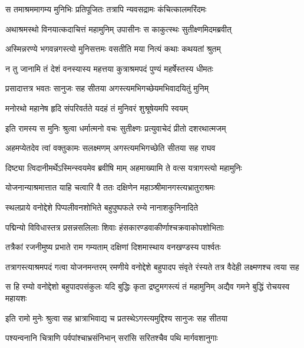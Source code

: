\twolineshloka
{स तमाश्रममागम्य मुनिभिः प्रतिपूजितः}
{तत्रापि न्यवसद्रामः कंचित्कालमरिंदमः} %

\twolineshloka
{अथाश्रमस्थो विनयात्कदाचित्तं महामुनिम्}
{उपासीनः स काकुत्स्थः सुतीक्ष्णमिदमब्रवीत्} %

\twolineshloka
{अस्मिन्नरण्ये भगवन्नगस्त्यो मुनिसत्तमः}
{वसतीति मया नित्यं कथाः कथयतां श्रुतम्} %

\twolineshloka
{न तु जानामि तं देशं वनस्यास्य महत्तया}
{कुत्राश्रमपदं पुण्यं महर्षेस्तस्य धीमतः} %

\twolineshloka
{प्रसादात्तत्र भवतः सानुजः सह सीतया}
{अगस्त्यमभिगच्छेयमभिवादयितुं मुनिम्} %

\twolineshloka
{मनोरथो महानेष हृदि संपरिवर्तते}
{यदहं तं मुनिवरं शुश्रूषेयमपि स्वयम्} %

\twolineshloka
{इति रामस्य स मुनिः श्रुत्वा धर्मात्मनो वचः}
{सुतीक्ष्णः प्रत्युवाचेदं प्रीतो दशरथात्मजम्} %

\twolineshloka
{अहमप्येतदेव त्वां वक्तुकामः सलक्ष्मणम्}
{अगस्त्यमभिगच्छेति सीतया सह राघव} %

\twolineshloka
{दिष्ट्या त्विदानीमर्थेऽस्मिन्स्वयमेव ब्रवीषि माम्}
{अहमाख्यामि ते वत्स यत्रागस्त्यो महामुनिः} %

\twolineshloka
{योजनान्याश्रमात्तात याहि चत्वारि वै ततः}
{दक्षिणेन महाञ्श्रीमानगस्त्यभ्रातुराश्रमः} %

\twolineshloka
{स्थलप्राये वनोद्देशे पिप्पलीवनशोभिते}
{बहुपुष्पफले रम्ये नानाशकुनिनादिते} %

\twolineshloka
{पद्मिन्यो विविधास्तत्र प्रसन्नसलिलाः शिवाः}
{हंसकारण्डवाकीर्णाश्चक्रवाकोपशोभिताः} %

\twolineshloka
{तत्रैकां रजनीमुष्य प्रभाते राम गम्यताम्}
{दक्षिणां दिशमास्थाय वनखण्डस्य पार्श्वतः} %

\threelineshloka
{तत्रागस्त्याश्रमपदं गत्वा योजनमन्तरम्}
{रमणीये वनोद्देशे बहुपादप संवृते}
{रंस्यते तत्र वैदेही लक्ष्मणश्च त्वया सह} %

\threelineshloka
{स हि रम्यो वनोद्देशो बहुपादपसंकुलः}
{यदि बुद्धिः कृता द्रष्टुमगस्त्यं तं महामुनिम्}
{अद्यैव गमने बुद्धिं रोचयस्व महायशः} %

\twolineshloka
{इति रामो मुनेः श्रुत्वा सह भ्रात्राभिवाद्य च}
{प्रतस्थेऽगस्त्यमुद्दिश्य सानुजः सह सीतया} %

\twolineshloka
{पश्यन्वनानि चित्राणि पर्वपांश्चाभ्रसंनिभान्}
{सरांसि सरितश्चैव पथि मार्गवशानुगाः} %

